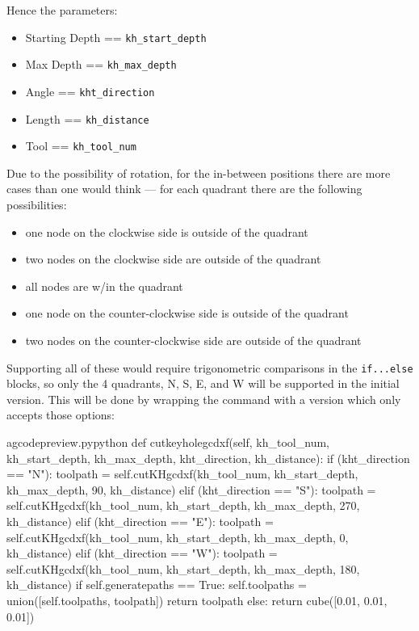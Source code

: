 \documentclass{ltxdoc}
\begin{document}
\bigskip

\noindent Hence the parameters:

\begin{itemize}
\item Starting Depth == \verb|kh_start_depth|
\item Max Depth == \verb|kh_max_depth|
\item Angle == \verb|kht_direction|
\item Length == \verb|kh_distance|
\item Tool == \verb|kh_tool_num|
\end{itemize}

Due to the possibility of rotation, for the in-between positions there are more cases than one would think --- for each quadrant there are the following possibilities:

\begin{itemize}
 \item one node on the clockwise side is outside of the quadrant
 \item two nodes on the clockwise side are outside of the quadrant
 \item all nodes are w/in the quadrant
 \item one node on the counter-clockwise side is outside of the quadrant
 \item two nodes on the counter-clockwise side are outside of the quadrant
\end{itemize}
 
Supporting all of these would require trigonometric comparisons in the \verb|if...else| blocks, so only the 4 quadrants, N, S, E, and W will be supported in the initial version. This will be done by wrapping the command with a version which only accepts those options: 

\lstset{firstnumber=\thegcpy}
\begin{writecode}{a}{gcodepreview.py}{python}
    def cutkeyholegcdxf(self, kh_tool_num, kh_start_depth, kh_max_depth, kht_direction, kh_distance):   
        if (kht_direction == "N"): 
            toolpath = self.cutKHgcdxf(kh_tool_num, kh_start_depth, kh_max_depth, 90, kh_distance)
        elif (kht_direction == "S"):
            toolpath = self.cutKHgcdxf(kh_tool_num, kh_start_depth, kh_max_depth, 270, kh_distance)
        elif (kht_direction == "E"):
            toolpath = self.cutKHgcdxf(kh_tool_num, kh_start_depth, kh_max_depth, 0, kh_distance)
        elif (kht_direction == "W"):
            toolpath = self.cutKHgcdxf(kh_tool_num, kh_start_depth, kh_max_depth, 180, kh_distance)
        if self.generatepaths == True:
            self.toolpaths = union([self.toolpaths, toolpath])
            return toolpath
        else:
            return cube([0.01, 0.01, 0.01])

\end{writecode}
\addtocounter{gcpy}{15}
\end{document}
